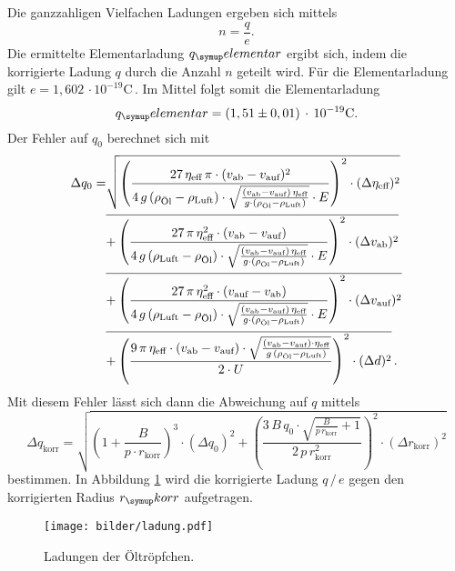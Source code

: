 Die ganzzahligen Vielfachen Ladungen ergeben sich mittels
\begin{equation}
  n = \frac{q}{e}.
\end{equation}
Die ermittelte Elementarladung $q_\su{elementar}$ ergibt sich, indem die korrigierte Ladung $q$ durch die Anzahl $n$ geteilt wird. Für die Elementarladung gilt $e=1,602\,\cdot 10^{-19}\si{\coulomb}$\,\cite{el}.
Im Mittel folgt somit die Elementarladung
\begin{equation}
  q_\su{elementar} = (1,51\pm0,01)\,\cdot\,10^{-19}\si{\coulomb}.
\end{equation}
Der Fehler auf $q_0$ berechnet sich mit
\begin{align}
 \Delta q_\text{0} = &\sqrt{\left(
\frac{27\,\eta_\text{eff}\,\pi\cdot(v_\text{ab} -
v_\text{auf})^2}{4\,g\,(\rho_\text{Öl} - \rho_\text{Luft}) \cdot \sqrt{
\frac{(v_\text{ab} -
v_\text{auf})\,\eta_\text{eff}}{g\cdot(\rho_\text{Öl} -
\rho_\text{Luft})}} \cdot E} \right)^2 \cdot
(\Delta\eta_\text{eff})^2}\notag \\
 &\overline{+ \left( \frac{27\,\pi\,\eta_\text{eff}^2\cdot(v_\text{ab} -
v_\text{auf})}{4\,g\,(\rho_\text{Luft} - \rho_\text{Öl}) \cdot \sqrt{
\frac{(v_\text{ab} -
v_\text{auf})\,\eta_\text{eff}}{g\cdot(\rho_\text{Öl} -
\rho_\text{Luft})}} \cdot E} \right)^2 \cdot (\Delta
v_\text{ab})^2}\notag \\
 &\overline{+ \left( \frac{27\,\pi\,\eta_\text{eff}^2\cdot(v_\text{auf} -
v_\text{ab})}{4\,g\,(\rho_\text{Luft} - \rho_\text{Öl}) \cdot \sqrt{
\frac{(v_\text{ab} -
v_\text{auf})\,\eta_\text{eff}}{g\cdot(\rho_\text{Öl} -
\rho_\text{Luft})}} \cdot E}  \right)^2 \cdot (\Delta
v_\text{auf})^2}\notag \\
 &\overline{+ \left( \frac{9\,\pi\,\eta_\text{eff}\cdot(v_\text{ab} -
v_\text{auf})\cdot\sqrt{\frac{(v_\text{ab} -
v_\text{auf})\cdot\eta_\text{eff}}{g\,(\rho_\text{Öl} -
\rho_\text{Luft})}}}{2\cdot U}\right)^2 \cdot (\Delta d)^2}\,.
\end{align}
Mit diesem Fehler lässt sich dann die Abweichung auf $q$ mittels
\begin{equation}
 \Delta q_\text{korr} = \sqrt{\left(1 + \frac{B}{p\cdot
r_\text{korr}}\right)^3 \cdot (\Delta q_\text{0})^2 +
\left(\frac{3\,B\,q_\text{0} \cdot \sqrt{\frac{B}{p\,r_\text{korr}} +
1}}{2\,p\,r_\text{korr}^2}\right)^2\cdot (\Delta r_\text{korr})^2}
\end{equation}
bestimmen.
In Abbildung \ref{fig:ladung} wird die korrigierte Ladung $q\,/\,e$ gegen
den korrigierten Radius $r_\su{korr}$ aufgetragen.
\begin{figure}[H]
  \centering
  \texttt{[image: bilder/ladung.pdf]}
  \caption{Ladungen der Öltröpfchen.}
  \label{fig:ladung}
\end{figure}
